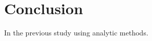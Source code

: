 \documentclass[conference]{IEEEtran}
\begin{document}
\section{Conclusion}
In the previous study using analytic methods.



% 
% 
% 
% 
% 
% 
% 
\end{document}
